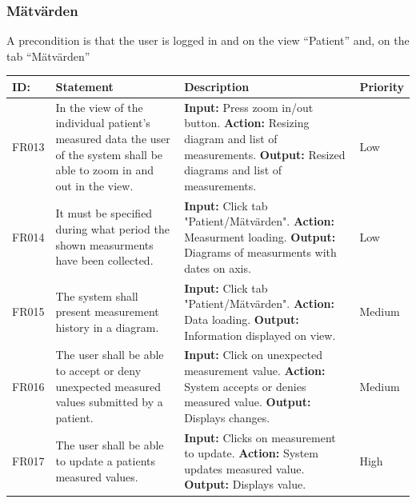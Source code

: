 \documentclass{scrreprt}
\begin{document}
\subsubsection{Mätvärden}
A precondition is that the user is logged in and on the view “Patient” and, on the tab “Mätvärden”
\begin{center}
\begin{tabularx}{\linewidth}{| l | X | X | l |}
\hline
\textbf{ID:} & \textbf{Statement} & \textbf{Description} & \textbf{Priority} \\ 
\hline
FR013 & In the view of the individual patient's measured data the user of the system shall be able to zoom in and out in the view.  & \textbf{Input:} Press zoom in/out button.
\newline \textbf{Action:} Resizing diagram and list of measurements.
\newline \textbf{Output:} Resized diagrams and list of measurements. & Low \\ 
\hline
FR014 & It must be specified during what period the shown measurments have been collected. & \textbf{Input:} Click tab "Patient/Mätvärden".
\newline \textbf{Action:} Measurment loading.
\newline \textbf{Output:} Diagrams of measurments with dates on axis. & Low \\ 
\hline
FR015 & The system shall present measurement history in a diagram. & \textbf{Input:} Click tab "Patient/Mätvärden".
\newline \textbf{Action:} Data loading.
\newline \textbf{Output:} Information displayed on view. & Medium \\ 
\hline
FR016 & The user shall be able to accept or deny unexpected measured values submitted by a patient.  & \textbf{Input:} Click on unexpected measurement value.
\newline \textbf{Action:} System accepts or denies measured value.
\newline \textbf{Output:} Displays changes. & Medium \\ 
\hline
FR017 & The user shall be able to update a patients measured values.  & \textbf{Input:} Clicks on measurement to update.
\newline \textbf{Action:} System updates measured value.
\newline \textbf{Output:} Displays value. & High \\ 
\hline
\end{tabularx}
\end{center}
\end{document}
